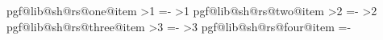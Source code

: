 {{{\begin{pgfscope}
                \end{pgfscope}%
            }%
            \expandafter\ifx\csname pgf@lib@sh@rs@one@item\endcsname\pgf@lib@sh@rs@nonetext\else%
                \edef\pgf@cs@topy{\the\pgfutil@tempdima}%
                \ifnum\parts>1\relax\edef\pgf@cs@boty{\chordyone}\else%
                    \pgf@xa=-\pgfutil@tempdima\edef\pgf@cs@boty{\the\pgf@xa}\fi%
                \edef\pgf@cs@fillcolor{\csname pgf@lib@sh@rs@one@item\endcsname}%
                \pgf@cs@fillstrip%
            \fi%
            \ifnum\parts>1\relax%
                \expandafter\ifx\csname pgf@lib@sh@rs@two@item\endcsname\pgf@lib@sh@rs@nonetext\else%
                    \edef\pgf@cs@topy{\chordyone}%
                    \ifnum\parts>2\relax\edef\pgf@cs@boty{\chordytwo}\else%
                        \pgf@xa=-\pgfutil@tempdima\edef\pgf@cs@boty{\the\pgf@xa}\fi%
                    \edef\pgf@cs@fillcolor{\csname pgf@lib@sh@rs@two@item\endcsname}%
                    \pgf@cs@fillstrip%
                \fi%
            \fi%
            \ifnum\parts>2\relax%
                \expandafter\ifx\csname pgf@lib@sh@rs@three@item\endcsname\pgf@lib@sh@rs@nonetext\else%
                    \edef\pgf@cs@topy{\chordytwo}%
                    \ifnum\parts>3\relax\edef\pgf@cs@boty{\chordythree}\else%
                        \pgf@xa=-\pgfutil@tempdima\edef\pgf@cs@boty{\the\pgf@xa}\fi%
                    \edef\pgf@cs@fillcolor{\csname pgf@lib@sh@rs@three@item\endcsname}%
                    \pgf@cs@fillstrip%
                \fi%
            \fi%
            \ifnum\parts>3\relax%
                \expandafter\ifx\csname pgf@lib@sh@rs@four@item\endcsname\pgf@lib@sh@rs@nonetext\else%
                    \edef\pgf@cs@topy{\chordythree}%
                    \pgf@xa=-\pgfutil@tempdima\edef\pgf@cs@boty{\the\pgf@xa}%
                    \edef\pgf@cs@fillcolor{\csname pgf@lib@sh@rs@four@item\endcsname}%
                    \pgf@cs@fillstrip%
                \fi%
            \fi%
        \fi%
    }%
}%



%
%

\newif\ifpgfellipsesplitdrawsplits\pgfellipsesplitdrawsplitstrue
\newif\ifpgfellipsesplitignoreemptyparts
\newif\ifpgfellipsesplitusecustomfill

